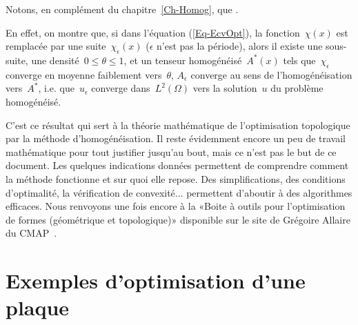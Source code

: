 \medskip
Notons, en complément du chapitre~\ref{Ch-Homog}, que .

En effet, on montre que, si dans l'équation (\ref{Eq-EcvOpt}), la fonction~$\chi(x)$ est remplacée par une suite~$\chi_\epsilon(x)$ ($\epsilon$ n'est pas la période), alors il existe une sous-suite, une densité~$0\le\theta\le1$, et un tenseur homogénéisé~$A^*(x)$ tels que~$\chi_\epsilon$ converge en moyenne faiblement vers~$\theta$, $A_\epsilon$ converge au sens de l'homogénéisation vers~$A^*$, i.e. que~$u_\epsilon$ converge dans~$L^2(\Omega)$ vers la solution~$u$ du problème homogénéisé.

\medskip
C'est ce résultat qui sert à la théorie mathématique de l'optimisation topologique par la méthode d'homogénéisation.
Il reste évidemment encore un peu de travail mathématique pour tout justifier jusqu'au bout, mais ce n'est pas le but de ce document. Les quelques indications données permettent de comprendre comment la méthode fonctionne et sur quoi elle repose.
Des simplifications, des conditions d'optimalité, la vérification de convexité... permettent d'aboutir à des algorithmes efficaces. Nous renvoyons une fois encore à la «Boite à outils \freefem pour l'optimisation de formes (géométrique et topologique)» disponible sur le site de Grégoire Allaire du CMAP~\cite{bib-AllaireOptimFF}.


\medskip
\section{Exemples d'optimisation d'une plaque}

